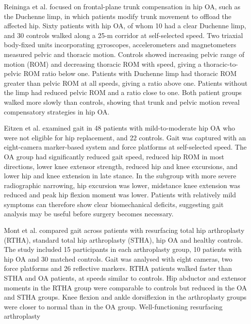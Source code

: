 \documentclass[12pt]{elsarticle}
\begin{document}
{ Reininga et al. \cite{reininga2012subjects} focused on frontal-plane trunk compensation in hip OA, such as the Duchenne limp, in which patients modify trunk movement to offload the affected hip. Sixty patients with hip OA, of whom 10 had a clear Duchenne limp, and 30 controls walked along a 25-m corridor at self-selected speed. Two triaxial body-fixed units incorporating gyroscopes, accelerometers and magnetometers measured pelvic and thoracic motion. Controls showed increasing pelvic range of motion (ROM) and decreasing thoracic ROM with speed, giving a thoracic-to-pelvic ROM ratio below one. Patients with Duchenne limp had thoracic ROM greater than pelvic ROM at all speeds, giving a ratio above one. Patients without the limp had reduced pelvic ROM and a ratio close to one. Both patient groups walked more slowly than controls, showing that trunk and pelvic motion reveal compensatory strategies in hip OA.}

{ Eitzen et al. \cite{eitzen2012sagittal} examined gait in 48 patients with mild-to-moderate hip OA who were not eligible for hip replacement, and 22 controls.  Gait was captured with an eight-camera marker-based system and force platforms at self-selected speed. The OA group had significantly reduced gait speed, reduced hip ROM in most directions, lower knee extensor strength, reduced hip and knee excursions, and lower hip and knee extension in late stance. In the subgroup with more severe radiographic narrowing, hip excursion was lower, midstance knee extension was reduced and peak hip flexion moment was lower. Patients with relatively mild symptoms can therefore show clear biomechanical deficits, suggesting gait analysis may be useful before surgery becomes necessary.}

{ Mont et al. \cite{mont2007gait} compared gait across patients with resurfacing total hip arthroplasty (RTHA), standard total hip arthroplasty (STHA), hip OA and healthy controls. The study included 15 participants in each arthroplasty group, 10 patients with hip OA and 30 matched controls. Gait was analysed with eight cameras, two force platforms and 26 reflective markers. RTHA patients walked faster than STHA and OA patients, at speeds similar to controls. Hip abductor and extensor moments in the RTHA group were comparable to controls but reduced in the OA and STHA groups. Knee flexion and ankle dorsiflexion in the arthroplasty groups were closer to normal than in the OA group. Well-functioning resurfacing arthroplasty }
\end{document}
